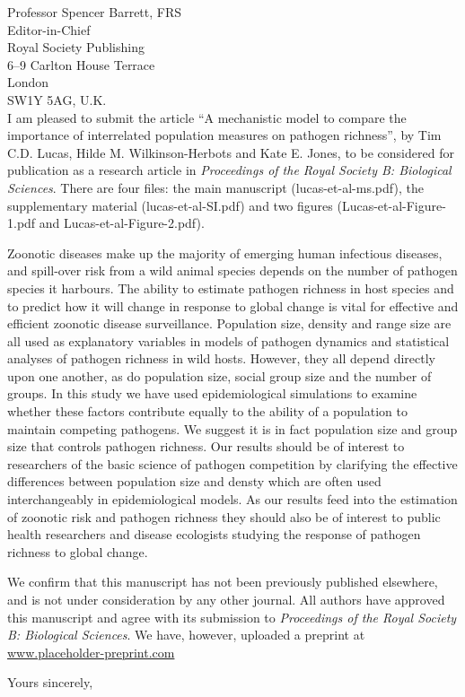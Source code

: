 \documentclass[10pt, a4paper]{letter} %
\begin{document}
\begin{letter}{
Professor Spencer Barrett, FRS\\
Editor-in-Chief\\
Royal Society Publishing\\
6--9 Carlton House Terrace\\
London\\
SW1Y 5AG, U.K.\\

}
I am pleased to submit the article ``A mechanistic model to compare the importance of interrelated population measures on pathogen richness'', by Tim C.D. Lucas, Hilde M. Wilkinson-Herbots and Kate E. Jones, to be considered for publication as a research article in \emph{Proceedings of the Royal Society B: Biological Sciences}.
There are four files: the main manuscript (lucas-et-al-ms.pdf), the supplementary material (lucas-et-al-SI.pdf) and two figures (Lucas-et-al-Figure-1.pdf and Lucas-et-al-Figure-2.pdf).

Zoonotic diseases make up the majority of emerging human infectious diseases, and spill-over risk from a wild animal species depends on the number of pathogen species it harbours.
The ability to estimate pathogen richness in host species and to predict how it will change in response to global change is vital for effective and efficient zoonotic disease surveillance.
Population size, density and range size are all used as explanatory variables in models of pathogen dynamics and statistical analyses of pathogen richness in wild hosts.
However, they all depend directly upon one another, as do population size, social group size and the number of groups.
In this study we have used epidemiological simulations to examine whether these factors contribute equally to the ability of a population to maintain competing pathogens.
We suggest it is in fact population size and group size that controls pathogen richness.
Our results should be of interest to researchers of the basic science of pathogen competition by clarifying the effective differences between population size and densty which are often used interchangeably in epidemiological models.
As our results feed into the estimation of zoonotic risk and pathogen richness they should also be of interest to public health researchers and disease ecologists studying the response of pathogen richness to global change.

We confirm that this manuscript has not been previously published elsewhere, and is not under consideration by any other journal. All authors have approved this manuscript and agree with its submission to \emph{Proceedings of the Royal Society B: Biological Sciences}.
We have, however, uploaded a preprint at \hyperref[www.preprint.com]{www.placeholder-preprint.com} %

\closing{Yours sincerely,}




\end{letter}
\end{document}
